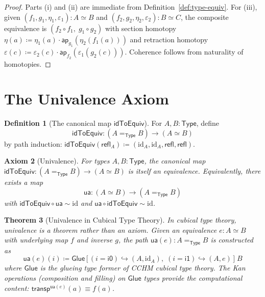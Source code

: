 \documentclass[11pt,a4paper]{report}
\theoremstyle{definition}
\newtheorem{definition}{Definition}[chapter]
\theoremstyle{plain}
\newtheorem{theorem}[definition]{Theorem}
\newtheorem{axiom}[definition]{Axiom}
\newcommand{\Type}{\mathsf{Type}}
\newcommand{\transp}{\mathsf{transp}}
\begin{document}
\begin{proof}
Parts (i) and (ii) are immediate from Definition~\ref{def:type-equiv}.
For (iii), given $(f_1, g_1, \eta_1, \varepsilon_1) : A \simeq B$ and
$(f_2, g_2, \eta_2, \varepsilon_2) : B \simeq C$, the composite
equivalence is $(f_2 \circ f_1,\; g_1 \circ g_2)$ with section
homotopy $\eta(a) \coloneqq \eta_1(a) \cdot \mathsf{ap}_{g_1}(\eta_2(f_1(a)))$
and retraction homotopy
$\varepsilon(c) \coloneqq \varepsilon_2(c) \cdot \mathsf{ap}_{f_2}(\varepsilon_1(g_2(c)))$.
Coherence follows from naturality of homotopies.
\end{proof}

\section{The Univalence Axiom}

\begin{definition}[The canonical map $\mathsf{idToEquiv}$]
\label{def:idtoequiv}
For $A, B : \Type$, define
\[
  \mathsf{idToEquiv} : (A =_\Type B) \to (A \simeq B)
\]
by path induction: $\mathsf{idToEquiv}(\mathsf{refl}_A) \coloneqq
(\mathrm{id}_A, \mathrm{id}_A, \mathsf{refl}, \mathsf{refl})$.
\end{definition}

\begin{axiom}[Univalence]
\label{ax:univalence}
For types $A, B : \Type$, the canonical map
$\mathsf{idToEquiv} : (A =_\Type B) \to (A \simeq B)$
is itself an equivalence.  Equivalently, there exists a map
\[
  \mathsf{ua} : (A \simeq B) \to (A =_\Type B)
\]
with $\mathsf{idToEquiv} \circ \mathsf{ua} \sim \mathrm{id}$
and $\mathsf{ua} \circ \mathsf{idToEquiv} \sim \mathrm{id}$.
\end{axiom}

\begin{theorem}[Univalence in Cubical Type Theory]
\label{thm:ua-cubical}
In cubical type theory, univalence is a \emph{theorem} rather than
an axiom.  Given an equivalence $e : A \simeq B$ with underlying
map $f$ and inverse $g$, the path
$\mathsf{ua}(e) : A =_\Type B$ is constructed as
\[
  \mathsf{ua}(e)(i) \coloneqq \mathsf{Glue}\,\bigl[\,
    (i = \mathsf{i0}) \hookrightarrow (A, \mathrm{id}_A),\;
    (i = \mathsf{i1}) \hookrightarrow (A, e)\,\bigr]\; B
\]
where $\mathsf{Glue}$ is the glueing type former of CCHM cubical
type theory.  The Kan operations (composition and filling) on
$\mathsf{Glue}$ types provide the computational content:
$\transp^{\mathsf{ua}(e)}(a) \equiv f(a)$.
\end{theorem}
\end{document}

